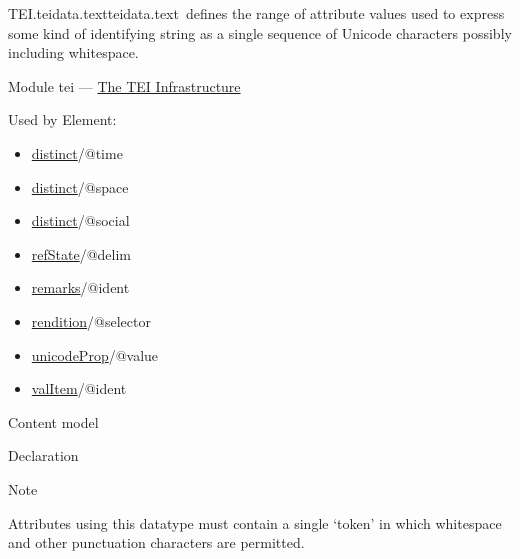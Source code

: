 \begin{reflist}
\item[]\begin{specHead}{TEI.teidata.text}{teidata.text} defines the range of attribute values used to express some kind of identifying string as a single sequence of Unicode characters possibly including whitespace.\end{specHead} 
    \item[{Module}]
  tei — \hyperref[ST]{The TEI Infrastructure}
    \item[{Used by}]
  Element: \begin{itemize}
\item \hyperref[TEI.distinct]{distinct}/@time
\item \hyperref[TEI.distinct]{distinct}/@space
\item \hyperref[TEI.distinct]{distinct}/@social
\item \hyperref[TEI.refState]{refState}/@delim
\item \hyperref[TEI.remarks]{remarks}/@ident
\item \hyperref[TEI.rendition]{rendition}/@selector
\item \hyperref[TEI.unicodeProp]{unicodeProp}/@value
\item \hyperref[TEI.valItem]{valItem}/@ident
\end{itemize} 
    \item[{Content model}]
    \item[{Declaration}]
    \item[{Note}]
  \par
Attributes using this datatype must contain a single ‘token’ in which whitespace and other punctuation characters are permitted.
\end{reflist}  
